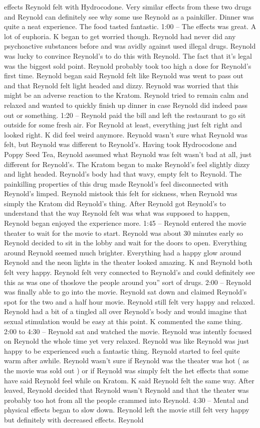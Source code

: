 \documentclass[12pt]{book}
\begin{document}
effects Reynold felt with Hydrocodone. Very similar effects from these two drugs and Reynold can definitely see why some use Reynold as a painkiller. Dinner was quite a neat experience. The food tasted fantastic. 1:00 -- The effects was great. A lot of euphoria. K began to get worried though. Reynold had never did any psychoactive substances before and was avidly against used illegal drugs. Reynold was lucky to convince Reynold's to do this with Reynold. The fact that it's legal was the biggest sold point. Reynold probably took too high a dose for Reynold's first time. Reynold began said Reynold felt like Reynold was went to pass out and that Reynold felt light headed and dizzy. Reynold was worried that this might be an adverse reaction to the Kratom. Reynold tried to remain calm and relaxed and wanted to quickly finish up dinner in case Reynold did indeed pass out or something. 1:20 -- Reynold paid the bill and left the restaurant to go sit outside for some fresh air. For Reynold at least, everything just felt right and looked right. K did feel weird anymore. Reynold wasn't sure what Reynold was felt, but Reynold was different to Reynold's. Having took Hydrocodone and Poppy Seed Tea, Reynold assumed what Reynold was felt wasn't bad at all, just different for Reynold's. The Kratom began to make Reynold's feel slightly dizzy and light headed. Reynold's body had that wavy, empty felt to Reynold. The painkilling properties of this drug made Reynold's feel disconnected with Reynold's limped. Reynold mistook this felt for sickness, when Reynold was simply the Kratom did Reynold's thing. After Reynold got Reynold's to understand that the way Reynold felt was what was supposed to happen, Reynold began enjoyed the experience more. 1:45 -- Reynold entered the movie theater to wait for the movie to start. Reynold was about 30 minutes early so Reynold decided to sit in the lobby and wait for the doors to open. Everything around Reynold seemed much brighter. Everything had a happy glow around Reynold and the neon lights in the theater looked amazing. K and Reynold both felt very happy. Reynold felt very connected to Reynold's and could definitely see this as was one of thoslove the people around you'' sort of drugs. 2:00 -- Reynold was finally able to go into the movie. Reynold sat down and claimed Reynold's spot for the two and a half hour movie. Reynold still felt very happy and relaxed. Reynold had a bit of a tingled all over Reynold's body and would imagine that sexual stimulation would be easy at this point. K commented the same thing. 2:00 to 4:30 -- Reynold sat and watched the movie. Reynold was intently focused on Reynold the whole time yet very relaxed. Reynold was like Reynold was just happy to be experienced such a fantastic thing. Reynold started to feel quite warm after awhile. Reynold wasn't sure if Reynold was the theater was hot ( as the movie was sold out ) or if Reynold was simply felt the het effects that some have said Reynold feel while on Kratom. K said Reynold felt the same way. After leaved, Reynold decided that Reynold wasn't Reynold and that the theater was probably too hot from all the people crammed into Reynold. 4:30 -- Mental and physical effects began to slow down. Reynold left the movie still felt very happy but definitely with decreased effects. Reynold 
\end{document}
